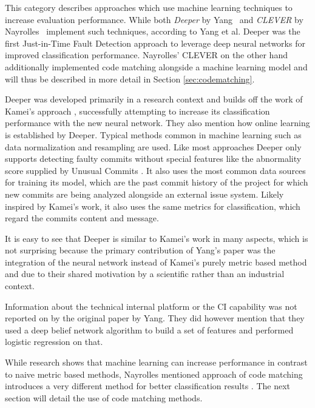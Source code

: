 This category describes approaches which use machine learning techniques to increase evaluation performance.
While both \textit{Deeper} by Yang~\cite{Yang2015} and \textit{CLEVER} by Nayrolles~\cite{Nayrolles2018} implement such techniques, according to Yang et al. Deeper was the first Just-in-Time Fault Detection approach to leverage deep neural networks for improved classification performance. Nayrolles' CLEVER on the other hand additionally implemented code matching alongside a machine learning model and will thus be described in more detail in Section \ref{sec:codematching}.

Deeper was developed primarily in a research context and builds off the work of Kamei's approach \cite{Kamei2013}, successfully attempting to increase its classification performance with the new neural network. 
They also mention how online learning is established by Deeper.
Typical methods common in machine learning such as data normalization and resampling are used. Like most approaches Deeper only supports detecting faulty commits without special features like the abnormality score supplied by Unusual Commits \cite{Goyal2017}. It also uses the most common data sources for training its model, which are the past commit history of the project for which new commits are being analyzed alongside an external issue system. Likely inspired by Kamei's work, it also uses the same metrics for classification, which regard the commits content and message. 

It is easy to see that Deeper is similar to Kamei's work in many aspects, which is not surprising because the primary contribution of Yang's paper was the integration of the neural network instead of Kamei's purely metric based method and 
due to their shared motivation by a scientific rather than an industrial context.

Information about the technical internal platform or the CI capability was not reported on by the original paper by Yang. They did however mention that they used a deep belief network algorithm to build a set of features and performed logistic regression on that.

While research shows that machine learning can increase performance in contrast to naive metric based methods, Nayrolles mentioned approach of code matching introduces a very different method for better classification results \cite{Nayrolles2018}. The next section will detail the use of code matching methods.

